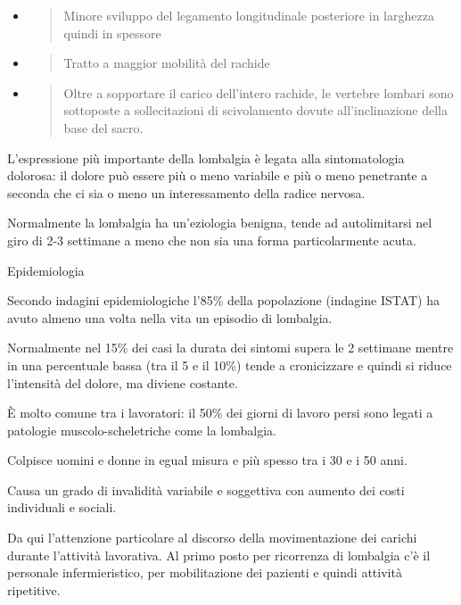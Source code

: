 \documentclass[]{article}
\begin{document}
\begin{itemize}
\item
  \begin{quote}
  Minore sviluppo del legamento longitudinale posteriore in larghezza
  quindi in spessore
  \end{quote}
\end{itemize}

\begin{itemize}
\item
  \begin{quote}
  Tratto a maggior mobilità del rachide
  \end{quote}
\end{itemize}

\begin{itemize}
\item
  \begin{quote}
  Oltre a sopportare il carico dell'intero rachide, le vertebre lombari
  sono sottoposte a sollecitazioni di scivolamento dovute
  all'inclinazione della base del sacro.
  \end{quote}
\end{itemize}

L'espressione più importante della lombalgia è legata alla
sintomatologia dolorosa: il dolore può essere più o meno variabile e più
o meno penetrante a seconda che ci sia o meno un interessamento della
radice nervosa.

Normalmente la lombalgia ha un'eziologia benigna, tende ad autolimitarsi
nel giro di 2-3 settimane a meno che non sia una forma particolarmente
acuta.

Epidemiologia

Secondo indagini epidemiologiche l'85\% della popolazione (indagine
ISTAT) ha avuto almeno una volta nella vita un episodio di lombalgia.

Normalmente nel 15\% dei casi la durata dei sintomi supera le 2
settimane mentre in una percentuale bassa (tra il 5 e il 10\%) tende a
cronicizzare e quindi si riduce l'intensità del dolore, ma diviene
costante.

È molto comune tra i lavoratori: il 50\% dei giorni di lavoro persi sono
legati a patologie muscolo-scheletriche come la lombalgia.

Colpisce uomini e donne in egual misura e più spesso tra i 30 e i 50
anni.

Causa un grado di invalidità variabile e soggettiva con aumento dei
costi individuali e sociali.

Da qui l'attenzione particolare al discorso della movimentazione dei
carichi durante l'attività lavorativa. Al primo posto per ricorrenza di
lombalgia c'è il personale infermieristico, per mobilitazione dei
pazienti e quindi attività ripetitive.
\end{document}
